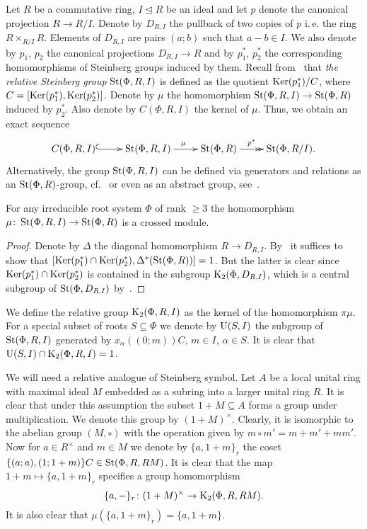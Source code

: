 Let $R$ be a commutative ring, $I \trianglelefteq R$ be an ideal and let $p$ denote the canonical projection $R \to R/I$.
Denote by $D_{R, I}$ the pullback of two copies of $p$ i.\,e. the ring $R \times_{R/I} R$.
Elements of $D_{R, I}$ are pairs $(a; b)$ such that $a-b \in I$.
We also denote by $p_1$, $p_2$ the canonical projections $D_{R, I} \to R$ and by $p_1^*$, $p_2^*$ the corresponding homomorphisms of Steinberg groups induced by them.
Recall from~\cite[Definition~2.5]{LS20} that \textit{the relative Steinberg group} $\operatorname{St}(\Phi, R, I)$ is defined as the quotient
$\operatorname{Ker}(p_1^*) / C$, where $C = [\operatorname{Ker}(p_1^*), \operatorname{Ker}(p_2^*)]$.
Denote by $\mu$ the homomorphism $\operatorname{St}(\Phi, R, I) \to \operatorname{St}(\Phi, R)$ induced by $p_2^*$.
Also denote by $C(\Phi, R, I)$ the kernel of $\mu$.
Thus, we obtain an exact sequence
\begin{equation}
    \xymatrix{C(\Phi, R, I) \ar@{^{(}->}[r] & \St(\Phi, R, I) \ar[r]^\mu & \St(\Phi, R) \ar@{->>}[r]^-{p^*} & \St(\Phi, R/I). }\label{eq:relative-Steinberg}
\end{equation}
Alternatively, the group $\operatorname{St}(\Phi, R, I)$ can be defined via generators and relations as an $\operatorname{St}(\Phi, R)$-group, cf.~\cite[Proposition~6]{S15}
or even as an abstract group, see~\cite{V22}.

\begin{lemma} \label{lem:rel-Steinberg-crossed-module}
For any irreducible root system $\Phi$ of rank $\geq 3$ the homomorphism $\mu \colon \operatorname{St}(\Phi, R, I) \to \operatorname{St}(\Phi, R)$ is a crossed module.
\end{lemma}
\begin{proof}
    Denote by $\Delta$ the diagonal homomorphism $R \to D_{R, I}.$
    By~\cite[Proposition~6]{Lo78} it suffices to show that $[\operatorname{Ker}(p_1^*) \cap \operatorname{Ker}(p_2^*), \Delta^*(\operatorname{St}(\Phi, R))] = 1$.
    But the latter is clear since $\operatorname{Ker}(p_1^*) \cap \operatorname{Ker}(p_2^*)$ is contained in the subgroup $\operatorname{K}_2(\Phi, D_{R, I})$,
     which is a central subgroup of $\operatorname{St}(\Phi, D_{R, I})$ by~\cite{LSV1}.
\end{proof}

We define the relative group $\operatorname{K}_2(\Phi, R, I)$ as the kernel of the homomorphism $\pi \mu$.
For a special subset of roots $S \subseteq \Phi$ we denote by $\operatorname{U}(S, I)$ the subgroup of $\operatorname{St}(\Phi, R, I)$ generated by $x_\alpha((0;m))C$, $m \in I$, $\alpha \in S$.
It is clear that $\operatorname{U}(S, I) \cap \operatorname{K}_2(\Phi, R, I) = 1$.

We will need a relative analogue of Steinberg symbol.
Let $A$ be a local unital ring with maximal ideal $M$ embedded as a subring into a larger unital ring $R$.
It is clear that under this assumption the subset $1+M \subseteq A$ forms a group under multiplication.
We denote this group by $(1+M)^\times$.
Clearly, it is isomorphic to the abelian group $(M, \circ)$ with the operation given by $m \circ m' = m + m' + mm'$.
Now for $a \in R^\times$ and $m \in M$ we denote by $\{a, 1+m\}_r$ the coset $\{(a; a), (1; 1+m)\}C \in \operatorname{St}(\Phi, R, RM)$.
It is clear that the map $1+m \mapsto \{a, 1+m\}_r$ specifies a group homomorphism
\begin{equation} \label{eq:relative-symbol} \{ a, -\}_r \colon (1+M)^\times \to \operatorname{K}_2(\Phi, R, RM). \end{equation}
It is also clear that $\mu(\{a, 1+m\}_r) = \{a, 1+m\}$.

